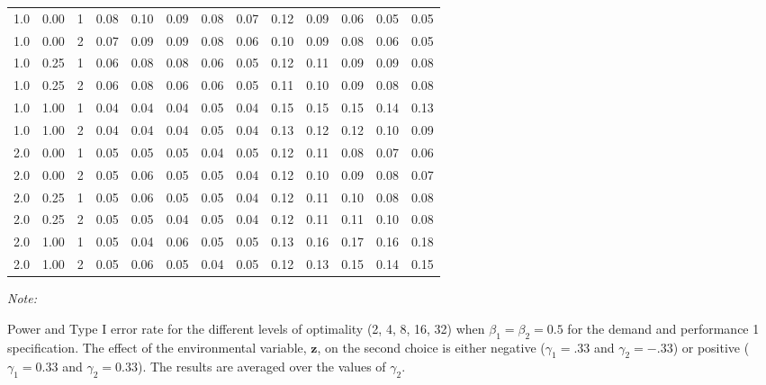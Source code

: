 \begin{table}
\begin{threeparttable}
\begin{tabular}[t]{rrrrrrrrrrrrr}
\hspace{1em}1.0 & 0.00 & 1 & 0.08 & 0.10 & 0.09 & 0.08 & 0.07 & 0.12 & 0.09 & 0.06 & 0.05 & 0.05\\
\hspace{1em}1.0 & 0.00 & 2 & 0.07 & 0.09 & 0.09 & 0.08 & 0.06 & 0.10 & 0.09 & 0.08 & 0.06 & 0.05\\
\hspace{1em}1.0 & 0.25 & 1 & 0.06 & 0.08 & 0.08 & 0.06 & 0.05 & 0.12 & 0.11 & 0.09 & 0.09 & 0.08\\
\hspace{1em}1.0 & 0.25 & 2 & 0.06 & 0.08 & 0.06 & 0.06 & 0.05 & 0.11 & 0.10 & 0.09 & 0.08 & 0.08\\
\hspace{1em}1.0 & 1.00 & 1 & 0.04 & 0.04 & 0.04 & 0.05 & 0.04 & 0.15 & 0.15 & 0.15 & 0.14 & 0.13\\
\hspace{1em}1.0 & 1.00 & 2 & 0.04 & 0.04 & 0.04 & 0.05 & 0.04 & 0.13 & 0.12 & 0.12 & 0.10 & 0.09\\
\hspace{1em}2.0 & 0.00 & 1 & 0.05 & 0.05 & 0.05 & 0.04 & 0.05 & 0.12 & 0.11 & 0.08 & 0.07 & 0.06\\
\hspace{1em}2.0 & 0.00 & 2 & 0.05 & 0.06 & 0.05 & 0.05 & 0.04 & 0.12 & 0.10 & 0.09 & 0.08 & 0.07\\
\hspace{1em}2.0 & 0.25 & 1 & 0.05 & 0.06 & 0.05 & 0.05 & 0.04 & 0.12 & 0.11 & 0.10 & 0.08 & 0.08\\
\hspace{1em}2.0 & 0.25 & 2 & 0.05 & 0.05 & 0.04 & 0.05 & 0.04 & 0.12 & 0.11 & 0.11 & 0.10 & 0.08\\
\hspace{1em}2.0 & 1.00 & 1 & 0.05 & 0.04 & 0.06 & 0.05 & 0.05 & 0.13 & 0.16 & 0.17 & 0.16 & 0.18\\
\hspace{1em}2.0 & 1.00 & 2 & 0.05 & 0.06 & 0.05 & 0.04 & 0.05 & 0.12 & 0.13 & 0.15 & 0.14 & 0.15\\
\bottomrule
\end{tabular}
\begin{tablenotes}
\item \textit{Note: } 
\item Power and Type I error rate for the different levels of optimality (2, 4, 8, 16, 32) when $\beta_1 = \beta_2 = 0.5$ for the demand and performance 1 specification. The effect of the environmental variable, $\mathbf{z}$, on the second choice is either negative ($\gamma_1 = .33$ and $\gamma_2 = -.33$) or positive ($\gamma_1 = 0.33$ and $\gamma_2 = 0.33$). The results are averaged over the values of $\gamma_2$.
\end{tablenotes}
\end{threeparttable}
\end{table}